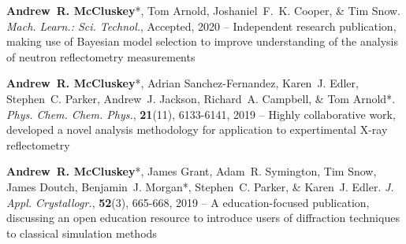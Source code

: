 \begin{cventriesy}
  \cventryy
    {
      \begin{cvitemsy}
        \item {\textbf{Andrew~R. McCluskey}*, Tom Arnold, Joshaniel~F.~K. Cooper, \& Tim Snow. \emph{Mach. Learn.: Sci. Technol.}, Accepted, 2020 -- Independent research publication, making use of Bayesian model selection to improve understanding of the analysis of neutron reflectometry measurements}
    \vspace{1mm}
        \item {\textbf{Andrew~R. McCluskey}*, Adrian Sanchez-Fernandez, Karen~J. Edler, Stephen~C. Parker, Andrew~J. Jackson, Richard~A. Campbell, \& Tom Arnold*. \emph{Phys. Chem. Chem. Phys.}, \textbf{21}(11), 6133-6141, 2019 -- Highly collaborative work, developed a novel analysis methodology for application to expertimental X-ray reflectometry}
    \vspace{1mm}
        \item {\textbf{Andrew~R. McCluskey}*, James Grant, Adam~R. Symington, Tim Snow, James Doutch, Benjamin~J. Morgan*, Stephen~C. Parker, \& Karen~J. Edler. \emph{J. Appl. Crystallogr.}, \textbf{52}(3), 665-668, 2019 -- A education-focused publication, discussing an open education resource to introduce users of diffraction techniques to classical simulation methods} 
      \end{cvitemsy}
    }
\end{cventriesy}
